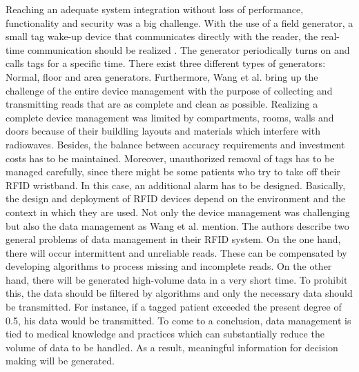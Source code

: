 Reaching an adequate system integration without loss of performance, functionality and security was a big challenge. With the use of a field generator, a small tag wake-up device that communicates directly with the reader, the real-time communication should be realized \cite[p.4]{casestudy}. The generator periodically turns on and calls tags for a specific time. There exist three different types of generators: Normal, floor and area generators.
Furthermore, Wang et al. bring up the challenge of the entire device management \cite[p.5]{casestudy} with the purpose of collecting and transmitting reads that are as complete and clean as possible. Realizing a complete device management was limited by compartments, rooms, walls and doors because of their buildling layouts and materials which interfere with radiowaves. Besides, the balance between accuracy requirements and investment costs has to be maintained. Moreover, unauthorized removal of tags has to be managed carefully, since there might be some patients who try to take off their RFID wristband. In this case, an additional alarm has to be designed. Basically, the design and deployment of RFID devices depend on the environment and the context in which they are used. 
Not only the device management was challenging but also the data management as Wang et al. mention. The authors describe two general problems of data management in their RFID system. On the one hand, there will occur intermittent and unreliable reads. These can be compensated by developing algorithms to process missing and incomplete reads. On the other hand, there will be generated high-volume data in a very short time. To prohibit this, the data should be filtered by algorithms and only the necessary data should be transmitted. For instance, if a tagged patient exceeded the present degree of 0.5\celsius, his data would be transmitted. To come to a conclusion, data management is tied to medical knowledge and practices which can substantially reduce the volume of data to be handled. As a result, meaningful information for decision making will be generated.
 
